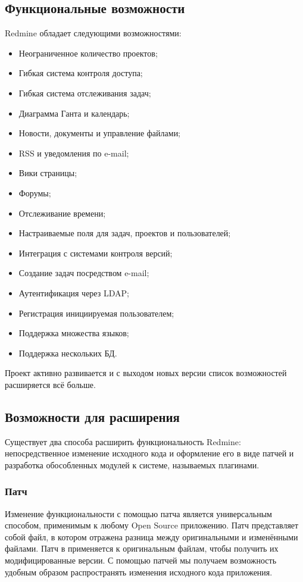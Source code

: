 \subsection{Функциональные возможности}
Redmine обладает следующими возможностями:
\begin{itemize}
  \item Неограниченное количество проектов;
  \item Гибкая система контроля доступа;
  \item Гибкая система отслеживания задач;
  \item Диаграмма Ганта и календарь;
  \item Новости, документы и управление файлами;
  \item RSS и уведомления по e-mail;
  \item Вики страницы;
  \item Форумы;
  \item Отслеживание времени;
  \item Настраиваемые поля для задач, проектов и пользователей;
  \item Интеграция с системами контроля версий;
  \item Создание задач посредством e-mail;
  \item Аутентификация через LDAP;
  \item Регистрация инициируемая пользователем;
  \item Поддержка множества языков;
  \item Поддержка нескольких БД.
\end{itemize}
Проект активно развивается и с выходом новых версии список возможностей
расширяется всё больше.

\subsection{Возможности для расширения}
Существует два способа расширить функциональность Redmine: непосредственное
изменение исходного кода и оформление его в виде патчей и разработка
обособленных модулей к системе, называемых плагинами.

\subsubsection{Патч}
Изменение функциональности с помощью патча является универсальным способом,
применимым к любому Open Source приложению. Патч представляет собой файл, в
котором отражена разница между оригинальными и изменёнными файлами. Патч в
применяется к оригинальным файлам, чтобы получить их модифицированные версии. С
помощью патчей мы получаем возможность удобным образом распространять изменения
исходного кода приложения.

